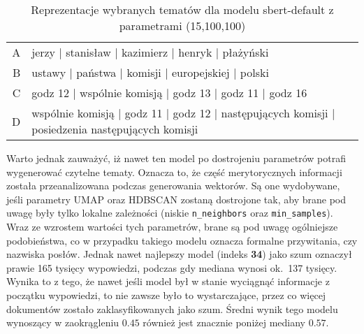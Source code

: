 		\begin{table}[htb]
			\caption{Reprezentacje wybranych tematów dla modelu sbert-default z parametrami (15,100,100)}\label{tab:sbert_default_topics} %
			\centering
			\small
			\begin{tabularx}{\textwidth}{rl}
				\toprule
				A & jerzy | stanisław | kazimierz | henryk | płażyński \\
				B & ustawy | państwa | komisji | europejskiej | polski \\
				C & godz 12 | wspólnie komisją | godz 13 | godz 11 | godz 16 \\
				D & wspólnie komisją | godz 11 | godz 12 | następujących komisji | posiedzenia następujących komisji \\
				\bottomrule
			\end{tabularx}
		\end{table}

		Warto jednak zauważyć, iż nawet ten model po dostrojeniu parametrów potrafi wygenerować czytelne tematy.
		Oznacza to, że część merytorycznych informacji została przeanalizowana podczas generowania wektorów.
		Są one wydobywane, jeśli parametry UMAP oraz HDBSCAN zostaną dostrojone tak,
			aby brane pod uwagę były tylko lokalne zależności (niskie \verb|n_neighbors| oraz \verb|min_samples|).
		Wraz ze wzrostem wartości tych parametrów, brane są pod uwagę ogólniejsze podobieństwa,
			co w przypadku takiego modelu oznacza formalne przywitania, czy nazwiska posłów.
		Jednak nawet najlepszy model (indeks \textbf{34}) jako szum oznaczył prawie 165 tysięcy wypowiedzi, podczas gdy mediana wynosi ok.~137 tysięcy.
		Wynika to z tego, że nawet jeśli model był w stanie wyciągnąć informacje z początku wypowiedzi, to nie zawsze było to wystarczające, przez co więcej dokumentów zostało zaklasyfikowanych jako szum.
		Średni wynik tego modelu wynoszący w zaokrągleniu \(0.45\) również jest znacznie poniżej mediany \(0.57\).

